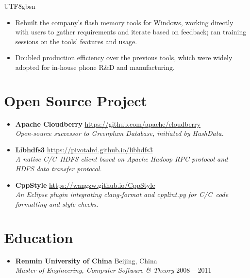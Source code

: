 \documentclass[10pt,a4paper]{article}
\newcommand{\entry}[4]{%
	\textbf{#1} \hfill {\color{subtle}#2}\\
	{\textit{#3}} \hfill {\color{subtle}\small #4}
}
\newcommand{\CPP}{C\nolinebreak[4]\hspace{-.05em}\raisebox{.22ex}{\footnotesize\bf ++}}
\begin{document}
\begin{CJK}{UTF8}{gbsn}
\begin{itemize}
\begin{itemize}
		\item Rebuilt the company's flash memory tools for Windows, working directly with users to gather requirements and iterate based on feedback; ran training sessions on the tools' features and usage.

		\item Doubled production efficiency over the previous tools, which were widely adopted for in-house phone R\&D and manufacturing.
	\end{itemize}
\end{itemize}

\section*{Open Source Project}

\begin{itemize}
	\item
	\textbf{Apache Cloudberry} \hfill {\color{subtle}\href{https://github.com/apache/cloudberry}{https://github.com/apache/cloudberry}}\\
	\textit{Open-source successor to Greenplum Database, initiated by HashData.}

	\item
	\textbf{Libhdfs3} \hfill {\color{subtle}\href{https://pivotalrd.github.io/libhdfs3}{https://pivotalrd.github.io/libhdfs3}}\\
	\textit{A native C/\CPP\  HDFS client based on Apache Hadoop RPC protocol and HDFS data transfer protocol.}

	\item
	\textbf{CppStyle} \hfill {\color{subtle}\href{https://wangzw.github.io/CppStyle}{https://wangzw.github.io/CppStyle}}\\
	\textit{An Eclipse plugin integrating clang-format and cpplint.py for C/\CPP\ code formatting and style checks.}
\end{itemize}

\section*{Education}

\begin{itemize}
	\item
	\entry{Renmin University of China}{Beijing, China}
		{Master of Engineering, Computer Software \& Theory}{2008 -- 2011}


\end{itemize}
\end{CJK}
\end{document}
